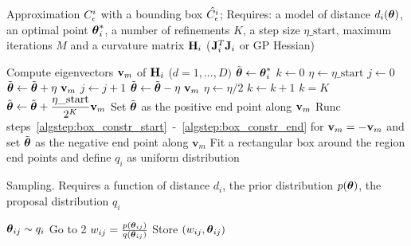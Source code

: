 \begin{algorithm}[!ht]
	\caption{Approximation \(C^i_{\epsilon}\) with a bounding box \(\hat{C^i_{\epsilon}}\); 
  Requires: a model of distance \(d_i(\boldsymbol{\theta})\), 
  an optimal point \(\boldsymbol{\theta}_i^*\), 
  a number of refinements \(K\), 
  a step size \(\eta\_\text{start}\), 
  maximum iterations \(M\) and 
  a curvature matrix \(\mathbf{H}_i\) (\(\mathbf{J}_i^T\mathbf{J}_i \) or GP Hessian)}\label{alg:region_construction}
	\begin{algorithmic}[1]
	\State Compute eigenvectors \(\mathbf{v}_{m}\) of \(\mathbf{H}_i\) {\scriptsize (\(d = 1,\ldots,D)\)}
		\State \(\Tilde{\boldsymbol{\theta}} \gets \boldsymbol{\theta}_i^*\) \label{algstep:box_constr_start}
		\State \(k \gets 0\)
		\State \(\eta \gets \eta\_\text{start}\) 
		\Repeat
          \State \(j \gets 0\)
        	\Repeat
            \State \(\Tilde{\boldsymbol{\theta}} \gets \Tilde{\boldsymbol{\theta}} + \eta \ \mathbf{v}_{m}\) 
            \State \(j \gets j + 1\)
        	 
        	\State \(\Tilde{\boldsymbol{\theta}} \gets \Tilde{\boldsymbol{\theta}} - \eta \ \mathbf{v}_{m}\)
        	\State \(\eta \gets \eta/2\) 
        	\State \(k \gets k + 1\)
      \Until \(k = K\)
       
        \State \(\Tilde{\boldsymbol{\theta}} \gets \Tilde{\boldsymbol{\theta}} + \dfrac{\eta\_{\text{start}}}{2^K} \mathbf{v}_m\) 
      \EndIf \label{algstep:box_constr_end}
    	\State Set \(\Tilde{\boldsymbol{\theta}}\) as the positive end point along \(\mathbf{v}_m\)
    	\State Runc steps~\ref{algstep:box_constr_start}~-~\ref{algstep:box_constr_end} for \(\mathbf{v}_m = - \mathbf{v}_m\) and set \(\Tilde{\boldsymbol{\theta}}\) as the negative end point along \(\mathbf{v}_{m}\)
	\EndFor
	\State Fit a rectangular box around the region end points and define \(q_i\) as uniform distribution
	\end{algorithmic}
\end{algorithm}



\begin{algorithm}[H]
    \centering
    \caption{Sampling. Requires a function of distance \(d_i\), the prior distribution \(p(\boldsymbol{\theta})\), the proposal distribution \(q_i\)}\label{alg:sampling_GB}
    \begin{algorithmic}[1]
      \State \(\boldsymbol{\theta}_{ij} \sim q_i\)
            \State Go to 2 
          \Else {}
            \State \(w_{ij} = \frac{p(\boldsymbol{\theta}_{ij})}{q(\boldsymbol{\theta}_{ij})}\) 
            \State Store \((w_{ij}, \boldsymbol{\theta}_{ij})\) 
          \EndIf
    \end{algorithmic}
\end{algorithm}
